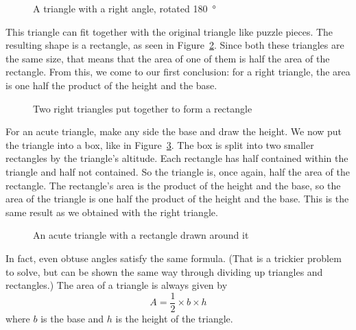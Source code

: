 \documentclass[a4paper,10pt]{report}
\begin{document}
\begin{figure}

  \caption{A triangle with a right angle, rotated \SI{180}{\degree}}
  \label{ar:triangle-right-rotated}
\end{figure}

This triangle can fit together with the original triangle like puzzle pieces.
The resulting shape is a rectangle, as seen in
Figure~\ref{ar:triangle-rectangle}. Since both these triangles are the same
size, that means that the area of one of them is half the area of the
rectangle. From this, we come to our first conclusion: for a right triangle,
the area is one half the product of the height and the base.

\begin{figure}

  \caption{Two right triangles put together to form a rectangle}
  \label{ar:triangle-rectangle}
\end{figure}

For an acute triangle, make any side the base and draw the height. We now put
the triangle into a box, like in Figure~\ref{ar:boxed-acute}. The box is split
into two smaller rectangles by the triangle's altitude. Each rectangle has half
contained within the triangle and half not contained. So the triangle is, once
again, half the area of the rectangle. The rectangle's area is the product of
the height and the base, so the area of the triangle is one half the product of
the height and the base. This is the same result as we obtained with the right
triangle.

\begin{figure}

  \caption{An acute triangle with a rectangle drawn around it}
  \label{ar:boxed-acute}
\end{figure}

In fact, even obtuse angles satisfy the same formula. (That is a trickier
problem to solve, but can be shown the same way through dividing up triangles
and rectangles.) The area of a triangle is always given by \begin{equation} A =
\frac{1}{2} \times b \times h \end{equation} where \(b\) is the base and \(h\)
is the height of the triangle.
\end{document}
